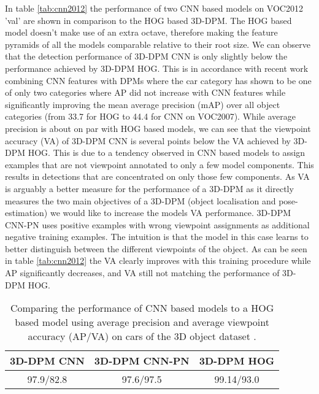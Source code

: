 In table \ref{tab:cnn2012} the performance of two CNN based models on VOC2012 'val' are shown in comparison to the HOG based 3D-DPM. The HOG based model doesn't make use of an extra octave, therefore making the feature pyramids of all the models comparable relative to their root size.  We can observe that the detection performance of 3D-DPM CNN is only slightly below the performance achieved  by 3D-DPM HOG. This is in accordance with recent work combining CNN features with DPMs \cite{girshick2014deformable} where the car category has shown to be one of only two categories where AP did not increase with CNN features while significantly improving the mean average precision (mAP) over all object categories (from 33.7 for HOG to 44.4 for CNN on VOC2007). While average precision is about on par with HOG based models, we can see that the viewpoint accuracy (VA) of 3D-DPM CNN is several points below the VA achieved by 3D-DPM HOG. This is due to a tendency observed in CNN based models to assign examples that are not viewpoint annotated to only a few model components. This results in detections that are concentrated on only those few components. As VA is arguably a better measure for the performance of a 3D-DPM as it directly measures the two main objectives of a 3D-DPM (object localisation and pose-estimation) we would like to increase the models VA performance. 3D-DPM CNN-PN uses positive examples with wrong viewpoint assignments as additional negative training examples. The intuition is that the model in this case learns to better distinguish between the different viewpoints of the object. As can be seen in table \ref{tab:cnn2012} the VA clearly improves with this training procedure while AP significantly decreases, and VA still not matching the performance of 3D-DPM HOG. %


\begin{table}[]
	\begin{center}
		\begin{tabular}{|c|c|c|}
		\hline
		3D-DPM CNN & 3D-DPM CNN-PN & 3D-DPM HOG\\
		\hline\hline
		97.9/82.8 & 97.6/97.5 & 99.14/93.0\\
		\hline
		\end{tabular}
	\end{center}
\caption{Comparing the performance of CNN based models to a HOG based model using average precision and average viewpoint accuracy (AP/VA) on cars of the 3D object dataset \cite{4408987}.}\label{tab:cnn3ddataset}
\end{table}

